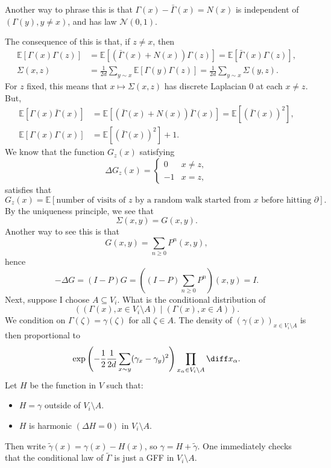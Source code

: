 \documentclass[12pt]{article}
\begin{document}
Another way to phrase this is that $\Gamma(x) - \bar \Gamma(x) = N(x)$ is independent of $(\Gamma(y), y \neq x)$, and has law $\mathcal{N}(0, 1)$.

The consequence of this is that, if $z \neq x$, then
\begin{align*}
	\mathbb{E}[\Gamma(x) \Gamma(z)] &= \mathbb{E}[(\bar \Gamma(x) + N(x)) \Gamma(z)] = \mathbb{E}[\bar \Gamma(x) \Gamma(z)], \\
	\Sigma(x, z) &= \frac 1{2d} \sum_{y \sim x} \mathbb{E}[\Gamma(y) \Gamma(z)] = \frac1{2d} \sum_{y \sim x} \Sigma(y, z).
\end{align*}
For $z$ fixed, this means that $x \mapsto \Sigma(x, z)$ has discrete Laplacian $0$ at each $x \neq z$. But,
\begin{align*}
	\mathbb{E}[\Gamma(x) \bar \Gamma(x)] &= \mathbb{E}[(\bar \Gamma(x) + N(x)) \bar \Gamma(x)] = \mathbb{E}[(\bar \Gamma(x))^2], \\
	\mathbb{E}[\Gamma(x) \Gamma(x)] &= \mathbb{E}[(\bar \Gamma(x))^2] + 1.
\end{align*}
We know that the function $G_z(x)$ satisfying
\[
\Delta G_z(x) =
\begin{cases}
	0 & x \neq z, \\
	-1 & x = z,
\end{cases}
\]
satisfies that
\[
	G_z(x) = \mathbb{E}[\text{number of visits of $z$ by a random walk started from $x$ before hitting $\partial$}].
\]
By the uniqueness principle, we see that
\[
\Sigma(x, y) = G(x, y).
\]
Another way to see this is that
\[
G(x, y) = \sum_{n \geq 0} P^{n}(x, y),
\]
hence
\[
	- \Delta G = (I - P) G = \left( (I - P) \sum_{n \geq 0} P^{n} \right) (x, y) = I.
\]
Next, suppose I choose $A \subseteq V_i$. What is the conditional distribution of 
\[
	((\Gamma(x), x \in V_i \setminus A) \mid (\Gamma(x), x \in A)).
\]
We condition on $\Gamma(\zeta) = \gamma(\zeta)$ for all $\zeta \in A$. The density of $(\gamma(x))_{x \in V_i \setminus A}$ is then proportional to
\[
	\exp \left( - \frac 12 \frac 1{2d} \sum_{x \sim y} (\gamma_x - \gamma_y)^2 \right) \prod_{x_\alpha \in V_i \setminus A} \diff x_\alpha.
\]
Let $H$ be the function in $V$ such that:
\begin{itemize}
	\item $H = \gamma$ outside of $V_i \setminus A$.
	\item $H$ is harmonic $(\Delta H = 0)$ in $V_i \setminus A$.
\end{itemize}
Then write $\tilde \gamma(x) = \gamma(x) - H(x)$, so $\gamma = H + \tilde \gamma$. One immediately checks that the conditional law of $\tilde \Gamma$ is just a GFF in $V_i \setminus A$.
\end{document}
